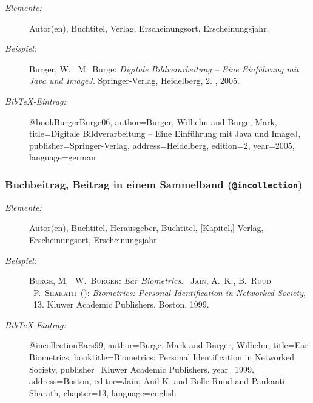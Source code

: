 \begin{description}
\item[\it Elemente:] \hfill\break
     Autor(en), Buchtitel, Verlag, Erscheinungsort, Erscheinungsjahr.
\item[\it Beispiel:] \hfill\break
     {\sc Burger, W.} \ {\sc M.~Burge}: {\em Digitale
  Bildverarbeitung -- Eine Einführung mit Java und ImageJ\/}.
\newblock Springer-Verlag, Heidelberg, 2. , 2005.
\item[\it BibTeX-Eintrag:] \mbox{}\par
%
\begin{GenericCode}
@book{BurgerBurge06,
    author={Burger, Wilhelm and Burge, Mark},
    title={Digitale Bildverarbeitung -- 
           Eine Einführung mit Java und ImageJ},
    publisher={Springer-Verlag},
    address={Heidelberg},
    edition={2},
    year={2005},
    language={german}
}
\end{GenericCode}
\end{description}

\subsubsection{Buchbeitrag, Beitrag in einem Sammelband (\texttt{@incollection})}
\nocite{Ears99}
\begin{description}
\item[\it Elemente:] \hfill\break
   Autor(en), Buchtitel, Herausgeber, Buchtitel, [Kapitel,] Verlag, Erscheinungsort,
   Erscheinungsjahr.
\item[\it Beispiel:] \hfill\break
\textsc{Burge, M.} \ \textsc{W.~Burger}: \emph{Ear Biometrics}.
\newblock {}\ \textsc{Jain, A.~K.}, \textsc{B.~Ruud} \
  \textsc{P.~Sharath}\ (): \emph{Biometrics: Per\-sonal
  Identification in Networked Society}, \btxchaptershort{.}~13. Klu\-wer
  Academic Publishers, Boston, 1999.
\item[\it BibTeX-Eintrag:] \mbox{}\par
%
\begin{GenericCode}
@incollection{Ears99,
  author={Burge, Mark and Burger, Wilhelm},
  title={Ear Biometrics},
  booktitle={Biometrics: Personal Identification in Networked
	           Society},
  publisher={Kluwer Academic Publishers},
  year={1999},
  address={Boston},
  editor={Jain, Anil K. and Bolle Ruud and Pankanti Sharath},
  chapter={13},
  language={english}
}
\end{GenericCode}
\end{description}


